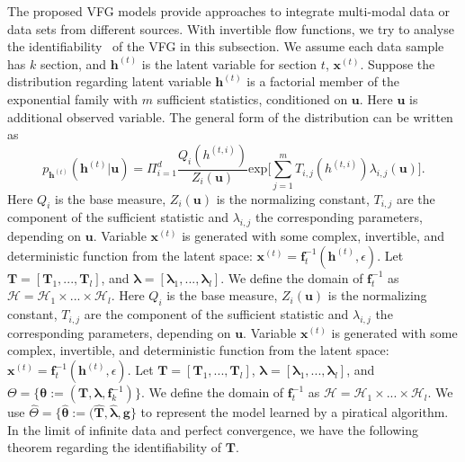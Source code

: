 \documentclass{article} %
\begin{document}
The proposed VFG models provide approaches to integrate multi-modal data or data sets from different sources. With  invertible flow functions, we try to analyse the identifiability~\citep{Khemakhem20a,Sorrenson2020} of the VFG in this subsection.  We assume each data sample has $k$ section, and $\mathbf{h}^{(t)}$ is the latent variable for section $t$, $\mathbf{x}^{(t)}$. Suppose the distribution regarding latent variable $\mathbf{h}^{(t)}$ is a factorial member of the exponential family with $m$ sufficient statistics, conditioned on $\mathbf{u}$. Here $\mathbf{u}$ is additional observed variable. The general form of the distribution can be written as 
\begin{equation}\label{eq:exp_h}
p_{\mathbf{h}^{(t)}}(\mathbf{h}^{(t)} | \mathbf{u}) = \Pi_{i=1}^d \frac{Q_i(h^{(t,i)})}{Z_i(\mathbf{u})} \text{exp}\bigg[ \sum_{j=1}^m T_{i,j}(h^{(t,i)}) \lambda_{i,j}(\mathbf{u}) \bigg].
\end{equation} 
Here $Q_i$ is the base measure, $Z_i(\mathbf{u})$ is the normalizing constant, $T_{i,j}$ are the component of the sufficient statistic and $\lambda_{i,j}$ the corresponding parameters,  depending on $\mathbf{u}$. Variable $\mathbf{x}^{(t)}$ is generated with some complex, invertible, and deterministic  function from the latent space: $\mathbf{x}^{(t)} = \mathbf{f}^{-1}_t(\mathbf{h}^{(t)}, \epsilon)$. Let $\mathbf{T} =[\mathbf{T}_1, ..., \mathbf{T}_l] $, and $\mathbf{\lambda} =[\mathbf{\lambda}_1, ..., \mathbf{\lambda}_l]$.  We define the domain of $\mathbf{f}_t^{-1}$ as $\mathcal{H}=\mathcal{H}_1 \times ... \times \mathcal{H}_l$.
Here $Q_i$ is the base measure, $Z_i(\mathbf{u})$ is the normalizing constant, $T_{i,j}$ are the component of the sufficient statistic and $\lambda_{i,j}$ the corresponding parameters,  depending on $\mathbf{u}$. Variable $\mathbf{x}^{(t)}$ is generated with some complex, invertible, and deterministic  function from the latent space: $\mathbf{x}^{(t)} = \mathbf{f}^{-1}_t(\mathbf{h}^{(t)}, \epsilon)$. Let $\mathbf{T} =[\mathbf{T}_1, ..., \mathbf{T}_l] $,  $\mathbf{\lambda} =[\mathbf{\lambda}_1, ..., \mathbf{\lambda}_l]$, and $\Theta = \{\mathbf{\theta} := (\mathbf{T}, \mathbf{\lambda}, \mathbf{f}^{-1}_k)\}$.  We define the domain of $\mathbf{f}_t^{-1}$ as $\mathcal{H}=\mathcal{H}_1 \times ... \times \mathcal{H}_l$. We use $\widehat{\Theta} = \{\widehat{\mathbf{\theta}} := (\widehat{\mathbf{T}}, \widehat{\mathbf{\lambda}}, \mathbf{g}\}$ to represent the model learned by a piratical algorithm.
In the limit of infinite data and perfect convergence, we have the following theorem regarding the identifiability of $\mathbf{T}$. 
\end{document}
